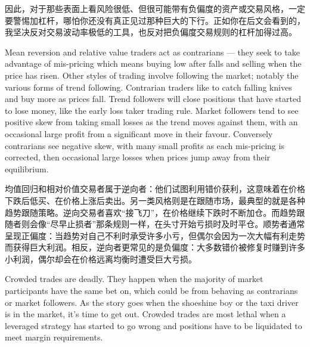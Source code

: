 \begin{chineseblock}因此，对于那些表面上看风险很低、但很可能带有负偏度的资产或交易风格，一定要警惕加杠杆，哪怕你还没有真正见过那种巨大的下行。正如你在后文会看到的，我坚决反对交易波动率极低的工具，也反对把负偏度交易规则的杠杆加得过高。\end{chineseblock}


\begin{englishblock} Mean reversion and relative value traders act as contrarians --- they seek to take advantage of mis-pricing which means buying low after falls and selling when the price has risen. Other styles of trading involve following the market; notably the various forms of trend following. Contrarian traders like to catch falling knives and buy more as prices fall. Trend followers will close positions that have started to lose money, like the early loss taker trading rule. Market followers tend to see positive skew from taking small losses as the trend moves against them, with an occasional large profit from a significant move in their favour. Conversely contrarians see negative skew, with many small profits as each mis-pricing is corrected, then occasional large losses when prices jump away from their equilibrium. \end{englishblock}

\begin{chineseblock}均值回归和相对价值交易者属于逆向者：他们试图利用错价获利，这意味着在价格下跌后低买、在价格上涨后卖出。另一类风格则是在跟随市场，最典型的就是各种趋势跟随策略。逆向交易者喜欢“接飞刀”，在价格继续下跌时不断加仓。而趋势跟随者则会像“尽早止损者”那条规则一样，在头寸开始亏损时及时平仓。顺势者通常呈现正偏度：当趋势对自己不利时承受许多小亏，但偶尔会因为一次大幅有利走势而获得巨大利润。相反，逆向者更常见的是负偏度：大多数错价被修复时赚到许多小利润，偶尔却会在价格远离均衡时遭受巨大亏损。\end{chineseblock}

\bipairgap

\begin{englishblock} Crowded trades are deadly. They happen when the majority of market participants have the same bet on, which could be from behaving as contrarians or market followers. As the story goes when the shoeshine boy or the taxi driver is in the market, it's time to get out. Crowded trades are most lethal when a leveraged strategy has started to go wrong and positions have to be liquidated to meet margin requirements. \end{englishblock}

